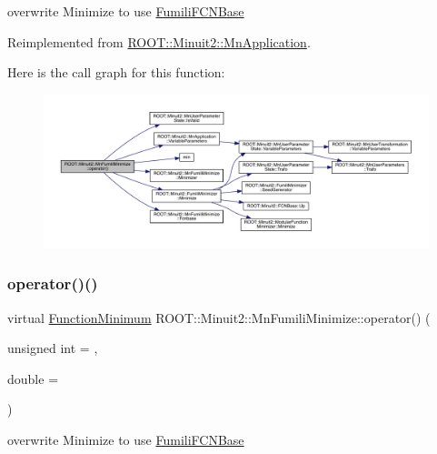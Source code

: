 overwrite Minimize to use \mbox{\hyperlink{classROOT_1_1Minuit2_1_1FumiliFCNBase}{Fumili\+F\+C\+N\+Base}} 



Reimplemented from \mbox{\hyperlink{classROOT_1_1Minuit2_1_1MnApplication_a8908d50d5d4f7f011b94bd10e51eacf7}{R\+O\+O\+T\+::\+Minuit2\+::\+Mn\+Application}}.

Here is the call graph for this function\+:
\nopagebreak
\begin{figure}[H]
\begin{center}
\leavevmode
\includegraphics[width=350pt]{dc/d88/classROOT_1_1Minuit2_1_1MnFumiliMinimize_a408e4cc7d16335d7a9bfbb8765acec6d_cgraph}
\end{center}
\end{figure}
\mbox{\label{classROOT_1_1Minuit2_1_1MnFumiliMinimize_a58da42cb9def0b42c424a3121987e77b}} 
\subsubsection{\texorpdfstring{operator()()}{operator()()}\hspace{0.1cm}{\footnotesize\ttfamily [3/3]}}
{\footnotesize\ttfamily virtual \mbox{\hyperlink{classROOT_1_1Minuit2_1_1FunctionMinimum}{Function\+Minimum}} R\+O\+O\+T\+::\+Minuit2\+::\+Mn\+Fumili\+Minimize\+::operator() (\begin{DoxyParamCaption}\item[{unsigned int}]{ = {},  }\item[{double}]{ = {} }\end{DoxyParamCaption})\hspace{0.3cm}{\ttfamily [virtual]}}



overwrite Minimize to use \mbox{\hyperlink{classROOT_1_1Minuit2_1_1FumiliFCNBase}{Fumili\+F\+C\+N\+Base}} 



